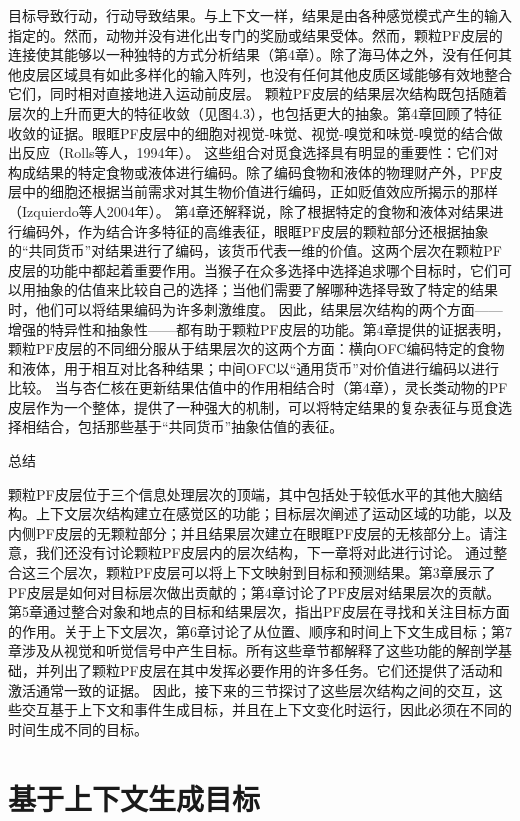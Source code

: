 目标导致行动，行动导致结果。与上下文一样，结果是由各种感觉模式产生的输入指定的。然而，动物并没有进化出专门的奖励或结果受体。然而，颗粒PF皮层的连接使其能够以一种独特的方式分析结果（第4章）。除了海马体之外，没有任何其他皮层区域具有如此多样化的输入阵列，也没有任何其他皮质区域能够有效地整合它们，同时相对直接地进入运动前皮层。
颗粒PF皮层的结果层次结构既包括随着层次的上升而更大的特征收敛（见图4.3），也包括更大的抽象。第4章回顾了特征收敛的证据。眼眶PF皮层中的细胞对视觉-味觉、视觉-嗅觉和味觉-嗅觉的结合做出反应（Rolls等人，1994年）。
这些组合对觅食选择具有明显的重要性：它们对构成结果的特定食物或液体进行编码。除了编码食物和液体的物理财产外，PF皮层中的细胞还根据当前需求对其生物价值进行编码，正如贬值效应所揭示的那样（Izquierdo等人2004年）。
第4章还解释说，除了根据特定的食物和液体对结果进行编码外，作为结合许多特征的高维表征，眼眶PF皮层的颗粒部分还根据抽象的“共同货币”对结果进行了编码，该货币代表一维的价值。这两个层次在颗粒PF皮层的功能中都起着重要作用。当猴子在众多选择中选择追求哪个目标时，它们可以用抽象的估值来比较自己的选择；当他们需要了解哪种选择导致了特定的结果时，他们可以将结果编码为许多刺激维度。
因此，结果层次结构的两个方面——增强的特异性和抽象性——都有助于颗粒PF皮层的功能。第4章提供的证据表明，颗粒PF皮层的不同细分服从于结果层次的这两个方面：横向OFC编码特定的食物和液体，用于相互对比各种结果；中间OFC以“通用货币”对价值进行编码以进行比较。
当与杏仁核在更新结果估值中的作用相结合时（第4章），灵长类动物的PF皮层作为一个整体，提供了一种强大的机制，可以将特定结果的复杂表征与觅食选择相结合，包括那些基于“共同货币”抽象估值的表征。

总结

颗粒PF皮层位于三个信息处理层次的顶端，其中包括处于较低水平的其他大脑结构。上下文层次结构建立在感觉区的功能；目标层次阐述了运动区域的功能，以及内侧PF皮层的无颗粒部分；并且结果层次建立在眼眶PF皮层的无核部分上。请注意，我们还没有讨论颗粒PF皮层内的层次结构，下一章将对此进行讨论。
通过整合这三个层次，颗粒PF皮层可以将上下文映射到目标和预测结果。第3章展示了PF皮层是如何对目标层次做出贡献的；第4章讨论了PF皮层对结果层次的贡献。第5章通过整合对象和地点的目标和结果层次，指出PF皮层在寻找和关注目标方面的作用。关于上下文层次，第6章讨论了从位置、顺序和时间上下文生成目标；第7章涉及从视觉和听觉信号中产生目标。所有这些章节都解释了这些功能的解剖学基础，并列出了颗粒PF皮层在其中发挥必要作用的许多任务。它们还提供了活动和激活通常一致的证据。
因此，接下来的三节探讨了这些层次结构之间的交互，这些交互基于上下文和事件生成目标，并且在上下文变化时运行，因此必须在不同的时间生成不同的目标。


\section{基于上下文生成目标}

